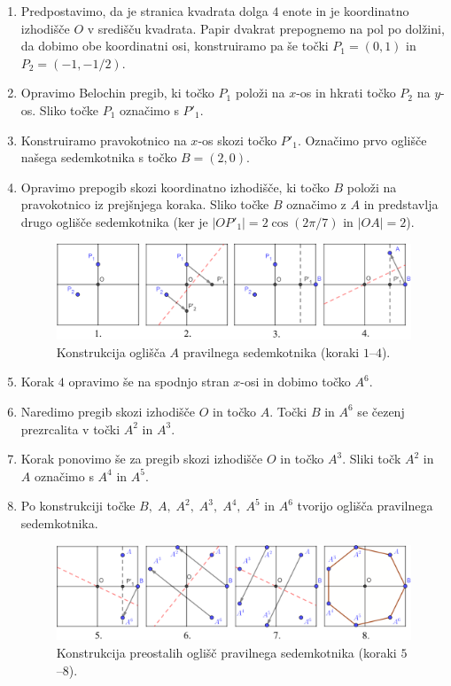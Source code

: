 \begin{enumerate}
    \item Predpostavimo, da je stranica kvadrata dolga $4$ enote in je koordinatno izhodišče $O$ v središču kvadrata. Papir dvakrat prepognemo na pol po dolžini, da dobimo obe koordinatni osi, konstruiramo pa še točki $P_1 = (0,1)$ in $P_2 = (-1, -1/2)$.
    \item Opravimo Belochin pregib, ki točko $P_1$ položi na $x$-os in hkrati točko $P_2$ na $y$-os. Sliko točke $P_1$ označimo s $P'_1$.
    \item Konstruiramo pravokotnico na $x$-os skozi točko $P'_1$. Označimo prvo oglišče našega sedemkotnika s točko $B = (2,0)$.
    \item Opravimo prepogib skozi koordinatno izhodišče, ki točko $B$ položi na pravokotnico iz prejšnjega koraka. Sliko točke $B$ označimo z $A$ in predstavlja drugo oglišče sedemkotnika (ker je $|OP'_1| = 2 \cos (2 \pi / 7)$ in $|OA| = 2$).
\begin{figure}[h]
    \centering
    \includegraphics[width=\textwidth]{images/n-kotniki/7kotnik_konstr1.png}
    \caption[Konstrukcija pravilnega sedemkotnika $1$.]{Konstrukcija oglišča $A$ pravilnega sedemkotnika (koraki $1$--$4$).}
    \label{fig:7kotnik_knstr1}
\end{figure}
    \item Korak $4$ opravimo še na spodnjo stran $x$-osi in dobimo točko $A^6$.
    \item Naredimo pregib skozi izhodišče $O$ in točko $A$. Točki $B$ in $A^6$ se čezenj prezrcalita v točki $A^2$ in $A^3$.
    \item Korak ponovimo še za pregib skozi izhodišče $O$ in točko $A^3$. Sliki točk $A^2$ in $A$ označimo s $A^4$ in $A^5$.
    \item Po konstrukciji točke $B, \; A, \; A^2, \; A^3, \; A^4, \; A^5$ in $A^6$ tvorijo oglišča pravilnega sedemkotnika.
    \begin{figure}[h]
        \centering
        \includegraphics[width=\textwidth]{images/n-kotniki/7kotnik_konstr2.png}
        \caption[Konstrukcija pravilnega sedemkotnika $2$.]{Konstrukcija preostalih oglišč pravilnega sedemkotnika (koraki $5$--$8$).}
        \label{fig:7kotnik_knstr2}
    \end{figure}
\end{enumerate}